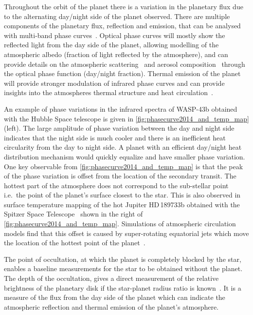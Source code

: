 Throughout the orbit of the planet there is a variation in the planetary flux due to the alternating day/night side of the planet observed.
There are multiple components of the planetary flux, reflection and emission, that can be analysed with multi-band phase curves~\citep[e.g.][]{knutson_characterizing_2009, esteves_optical_2013}.
Optical phase curves will mostly show the reflected light from the day side of the planet, allowing modelling of the atmospheric albedo (fraction of light reflected by the atmosphere), and can provide details on the atmospheric scattering~\citep{madhusudhan_analytic_2012} and aerosol composition~\citep{oreshenko_optical_2016} through the optical phase function (day/night fraction).
Thermal emission of the planet will provide stronger modulation of infrared phase curves and can provide insights into the atmospheres thermal
structure and heat circulation~\citep{goodman_thermodynamics_2009, koll_temperature_2016}.

An example of phase variations in the infrared spectra of {WASP-43b} obtained with the Hubble Space telescope is given in \cref{fig:phasecurve2014_and_temp_map} (left).
The large amplitude of phase variation between the day and night side indicates that the night side is much cooler and there is an inefficient heat circularity from the day to night side.
A planet with an efficient day/night heat distribution mechanism would quickly equalize and have smaller phase variation.
One key observable from \cref{fig:phasecurve2014_and_temp_map} is that the peak of the phase variation is offset from the location of the secondary transit.
The hottest part of the atmosphere does not correspond to the sub-stellar point i.e.\ the point of the planet's surface closest to the star.
This is also observed in surface temperature mapping of the hot Jupiter HD\,189733b obtained with the {Spitzer Space Telescope}~\citep{knutson_map_2007} shown in the right of \cref{fig:phasecurve2014_and_temp_map}.
Simulations of atmospheric circulation models find that this offset is caused by super-rotating equatorial jets which move the location of the hottest point of the planet~\citep[e.g.][and references therein]{heng_atmospheric_2015}.

The point of occultation, at which the planet is completely blocked by the star, enables a baseline measurements for the star to be obtained without the planet.
The depth of the occultation, gives a direct measurement of the relative brightness of the planetary disk if the star-planet radius ratio is known~\citep{winn_transits_2010}.
It is a measure of the flux from the day side of the planet which can indicate the atmospheric reflection and thermal emission of the planet's atmosphere.


